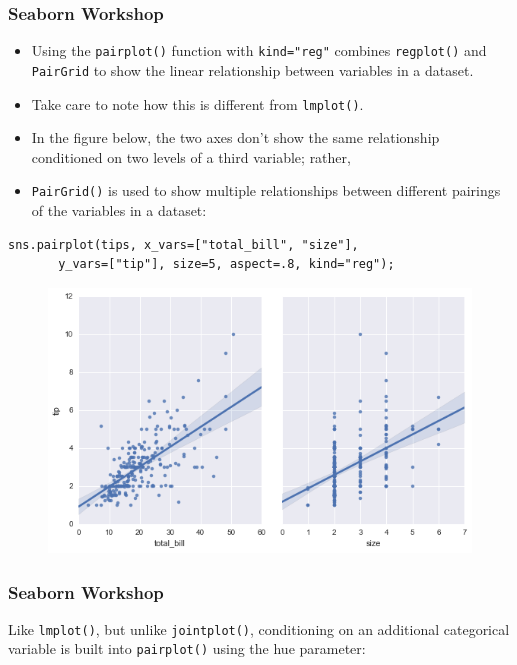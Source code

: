 \documentclass{beamer}
\begin{document}
\begin{frame}[fragile]
	\frametitle{Seaborn Workshop}
	\large
\begin{itemize}
\item Using the \texttt{pairplot()} function with \texttt{kind="reg"} combines \texttt{regplot()} and \texttt{PairGrid} to show the linear relationship between variables in a dataset.
\item Take care to note how this is different from \texttt{lmplot()}. 
\item In the figure below, the two axes don’t show the same relationship conditioned on two levels of a third variable; rather, \item \texttt{PairGrid()} is used to show multiple relationships between different pairings of the variables in a dataset:
\end{itemize}

\end{frame}
\begin{frame}[fragile]
	\large
\begin{verbatim}
sns.pairplot(tips, x_vars=["total_bill", "size"],  
       y_vars=["tip"], size=5, aspect=.8, kind="reg");
\end{verbatim}
\begin{figure}
\centering
\includegraphics[width=0.8\linewidth]{images/regression_53_0}
\end{figure}

\end{frame}
\begin{frame}[fragile]
	\frametitle{Seaborn Workshop}
	Like \texttt{lmplot()}, but unlike \texttt{jointplot()}, conditioning on an additional categorical variable is built into \texttt{pairplot()} using the hue parameter:

\end{frame}
\end{document}
